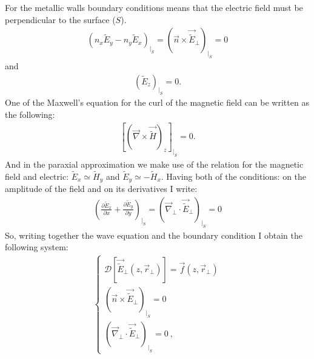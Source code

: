     For the metallic walls boundary conditions means that the electric field must be perpendicular to the surface ($S$).
        \begin{align}
            \left(n_x \widetilde{E}_y - n_y \widetilde{E}_x\right)_{\big|_S}=
            \left(\vec{n} \times \vec{\widetilde{E}}_\bot\right)_{\big|_S} = 0
        \end{align}
    and 
        \begin{align}
            \left(\widetilde{E}_{z}\right)_{\big|_S}= 0.
        \end{align}
    One of the Maxwell's equation for the curl of the magnetic field can be written as the following:
        \begin{align}
            \left[\left(\vec{\nabla} \times \vec{\widetilde{H}} \right)_{z}\right]_{\big|_{S}}= 0. 
        \end{align}
    And in the paraxial approximation we make use of the relation for the magnetic field and electric: $\widetilde{E}_x \simeq \widetilde{H}_y$ and $\widetilde{E}_y \simeq -\widetilde{H}_x$. Having both of the conditions: on the amplitude of the field and on its derivatives I write:
        \begin{align}
            \left(\frac{\partial \widetilde{E}_x}{\partial x} + \frac{\partial
            \widetilde{E}_y}{\partial y}\right)_{\big|_{S}} =
            \left(\vec{\nabla}_\bot \cdot
            \vec{\widetilde{E}}_\bot\right)_{\big|_S} = 0
        \end{align}
    So, writing together the wave equation and the boundary condition I obtain the following system:
        \begin{align}
            \left\{
            \begin{array}{l}
            \mathcal{D} \left[\vec{\widetilde{E}}_\bot(z,\vec{r}_\bot)\right]
            = \vec{f}(z, \vec{r}_\bot)
            \\
            \left(\vec{n} \times \vec{\widetilde{E}}_\bot\right)_{\big|_S} = 0
            \\
            \left(\vec{\nabla}_\bot \cdot
            \vec{\widetilde{E}}_\bot\right)_{\big|_S} = 0~,
            \end{array}\right.
            \label{Eq:boundary_conditions}
        \end{align}

